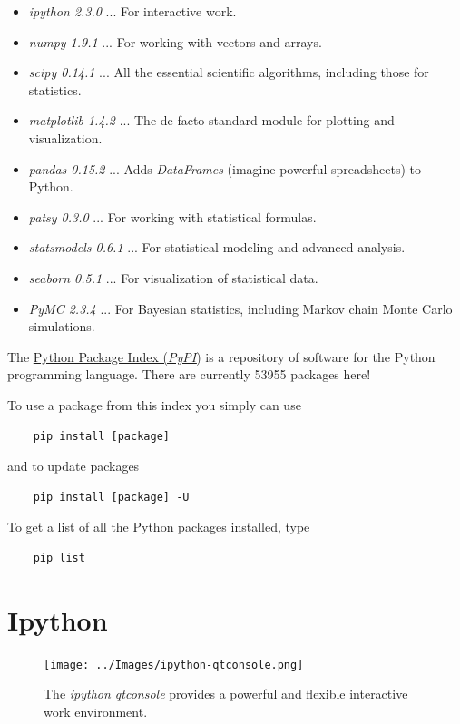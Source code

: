 \begin{itemize}
  \item \emph{ipython 2.3.0} ... For interactive work.
  \item \emph{numpy 1.9.1} ... For working with vectors and arrays.
  \item \emph{scipy 0.14.1} ... All the essential scientific algorithms, including those for statistics.
  \item \emph{matplotlib 1.4.2} ... The de-facto standard module for plotting and visualization.
  \item \emph{pandas 0.15.2} ... Adds \emph{DataFrames} (imagine powerful spreadsheets) to Python.
  \item \emph{patsy 0.3.0} ... For working with statistical formulas.
  \item \emph{statsmodels 0.6.1} ... For statistical modeling and advanced analysis.
  \item \emph{seaborn 0.5.1} ... For visualization of statistical data.
  \item \emph{PyMC 2.3.4} ... For Bayesian statistics, including Markov chain Monte Carlo simulations.
\end{itemize}

The \href{https://pypi.python.org/pypi}{Python Package Index (\emph{PyPI})} is a repository of software for the Python programming language. There are currently 53955 packages here!

To use a package from this index you simply can use

\begin{lstlisting}
    pip install [package]
\end{lstlisting}

and to update packages

\begin{lstlisting}
    pip install [package] -U
\end{lstlisting}

To get a list of all the Python packages installed, type

\begin{lstlisting}
    pip list
\end{lstlisting}


\section{Ipython}

\begin{figure}
  \centering
  \texttt{[image: ../Images/ipython-qtconsole.png]}\\
  \caption{The \emph{ipython qtconsole} provides a powerful and flexible interactive work environment.}
\end{figure}

